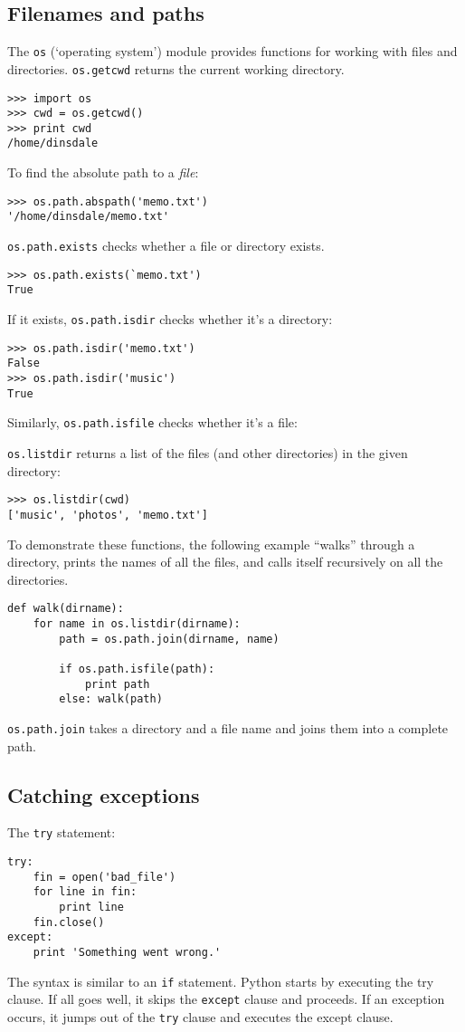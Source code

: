 \documentclass{article}
\begin{document}
\begin{multicols}{2}
\subsection{Filenames and paths} %
The \verb|os| (`operating system') module provides functions for working with
files and directories. \verb|os.getcwd| returns the current working directory.
\begin{lstlisting}
>>> import os
>>> cwd = os.getcwd()
>>> print cwd
/home/dinsdale
\end{lstlisting}
To find the absolute path to a \emph{file}:
\begin{lstlisting}
>>> os.path.abspath('memo.txt')
'/home/dinsdale/memo.txt'
\end{lstlisting}
\verb|os.path.exists| checks whether a file or directory exists.
\begin{lstlisting}
>>> os.path.exists(`memo.txt')
True
\end{lstlisting}

If it exists, \verb|os.path.isdir| checks whether it's a directory:
\begin{lstlisting}
>>> os.path.isdir('memo.txt')
False
>>> os.path.isdir('music')
True
\end{lstlisting}
Similarly, \verb|os.path.isfile| checks whether it's a file:

\verb|os.listdir| returns a list of the files (and other directories) in the given
directory:
\begin{lstlisting}
>>> os.listdir(cwd)
['music', 'photos', 'memo.txt']
\end{lstlisting}
To demonstrate these functions, the following example ``walks'' through a
directory, prints the names of all the files, and calls itself recursively on
all the directories.
\begin{lstlisting}
def walk(dirname):
    for name in os.listdir(dirname):
        path = os.path.join(dirname, name)

        if os.path.isfile(path):
            print path
        else: walk(path)
\end{lstlisting}
\verb|os.path.join| takes a directory and a file name and joins them into a
complete path.

\subsection{Catching exceptions} %

The \verb|try| statement:
\begin{lstlisting}
try:
    fin = open('bad_file')
    for line in fin:
        print line
    fin.close()
except:
    print 'Something went wrong.'
\end{lstlisting}
The syntax is similar to an \verb|if| statement.  Python starts by executing
the try clause. If all goes well, it skips the \verb|except| clause and
proceeds.  If an exception occurs, it jumps out of the \verb|try| clause and
executes the except clause.


\end{multicols}
\end{document}
